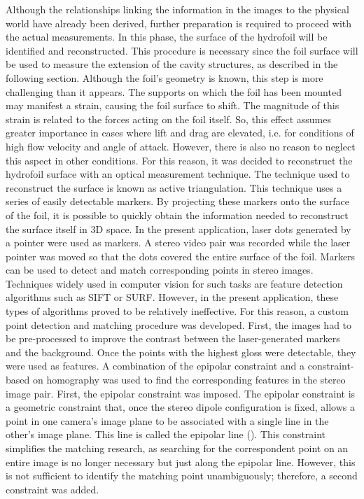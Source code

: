 Although the relationships linking the information in the images to the physical world have already been derived, further preparation is required to proceed with the actual measurements. In this phase, the surface of the hydrofoil will be identified and reconstructed.
This procedure is necessary since the foil surface will be used to measure the extension of the cavity structures, as described in the following section.
Although the foil's geometry is known, this step is more challenging than it appears. The supports on which the foil has been mounted may manifest a strain, causing the foil surface to shift.
The magnitude of this strain is related to the forces acting on the foil itself. So, this effect assumes greater importance in cases where lift and drag are elevated, i.e. for conditions of high flow velocity and angle of attack. However, there is also no reason to neglect this aspect in other conditions.
For this reason, it was decided to reconstruct the hydrofoil surface with an optical measurement technique.
The technique used to reconstruct the surface is known as active triangulation. This technique uses a series of easily detectable markers. 
By projecting these markers onto the surface of the foil, it is possible to quickly obtain the information needed to reconstruct the surface itself in 3D space. 
In the present application, laser dots generated by a pointer were used as markers.
A stereo video pair was recorded while the laser pointer was moved so that the dots covered the entire surface of the foil.
Markers can be used to detect and match corresponding points in stereo images. Techniques widely used in computer vision for such tasks are feature detection algorithms such as SIFT or SURF. However, in the present application, these types of algorithms proved to be relatively ineffective.
For this reason, a custom point detection and matching procedure was developed.
First, the images had to be pre-processed to improve the contrast between the laser-generated markers and the background. Once the points with the highest gloss were detectable, they were used as features.
A combination of the epipolar constraint and a constraint-based on homography was used to find the corresponding features in the stereo image pair.
First, the epipolar constraint was imposed. The epipolar constraint is a geometric constraint that, once the stereo dipole configuration is fixed, allows a point in one camera's image plane to be associated with a single line in the other's image plane. This line is called the epipolar line (\cite{Fusiello2005}).
This constraint simplifies the matching research, as searching for the correspondent point on an entire image is no longer necessary but just along the epipolar line. However, this is not sufficient to identify the matching point unambiguously; therefore, a second constraint was added. 
